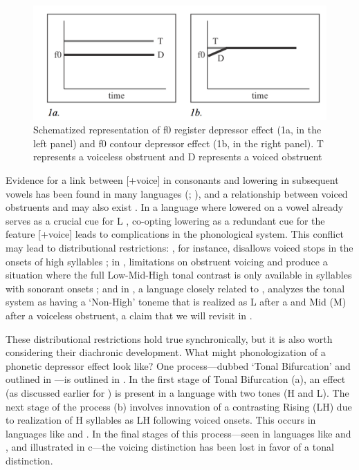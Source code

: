 \documentclass[output=paper
,newtxmath
,modfonts
,nonflat]{langsci/langscibook}
\begin{document}
\begin{figure} 
\includegraphics[width=\textwidth]{figures/fig-lotven-1.png}  

\caption{\label{fig:lotven:samson:1} Schematized representation of f0 register depressor effect (1a, in the left panel) and f0 contour depressor effect (1b, in the right panel). T represents a voiceless obstruent and D represents a voiced obstruent}
\end{figure}


Evidence for a link between [+voice] in consonants and  lowering in subsequent vowels has been found in many languages (\citealt{Bradshaw1999}; \citealt{Tang2008}), and a relationship between voiced obstruents and  may also exist \citep[5]{Yip2002}. In a  language where lowered  on a vowel already serves as a crucial cue for L , co-opting  lowering as a redundant cue for the feature [+voice] leads to complications in the phonological system. This conflict may lead to distributional restrictions: , for instance, disallows voiced stops in the onsets of high  syllables \citep{perkins2011}; in , limitations on obstruent voicing and  produce a situation where the full Low-Mid-High tonal contrast is only available in syllables with sonorant onsets \citep{Pearce2005}; and in , a language closely related to , \citet{Ansre1961} analyzes the tonal system as having a ‘Non-High’ toneme that is realized as L after a  and Mid (M) after a voiceless obstruent, a claim that we will revisit in . 

These distributional restrictions hold true synchronically, but it is also worth considering their diachronic development. What might phonologization of a phonetic depressor effect look like? One process—dubbed ‘Tonal Bifurcation’ and outlined in \citet{Hyman2013enlarging}—is outlined in . In the first stage of Tonal Bifurcation (a), an  effect (as discussed earlier for ) is present in a language with two  tones (H and L). The next stage of the process (b) involves innovation of a contrasting Rising (LH)  due to realization of H  syllables as LH following voiced onsets. This occurs in languages like  and  \citep{Ansre1961,Bole-Richard1983}. In the final stages of this process—seen in languages like  and  \citep{Downing2009}, and illustrated in c—the voicing distinction has been lost in favor of a tonal distinction.
\end{document}

